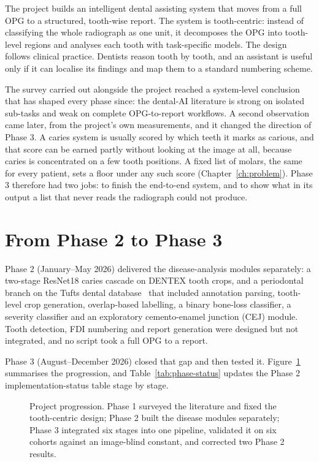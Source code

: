 The project builds an intelligent dental assisting system that moves from a full OPG to a
structured, tooth-wise report. The system is tooth-centric: instead of classifying the whole
radiograph as one unit, it decomposes the OPG into tooth-level regions and analyses each tooth with
task-specific models. The design follows clinical practice. Dentists reason tooth by tooth, and an
assistant is useful only if it can localise its findings and map them to a standard numbering
scheme. %

The survey carried out alongside the project reached a system-level conclusion that has shaped
every phase since: the dental-AI literature is strong on isolated sub-tasks and weak on complete
OPG-to-report workflows. A second observation came later, from the project's own measurements, and
it changed the direction of Phase 3. A caries system is usually scored by which teeth it marks as
carious, and that score can be earned partly without looking at the image at all, because caries is
concentrated on a few tooth positions. A fixed list of molars, the same for every patient, sets a
floor under any such score (Chapter~\ref{ch:problem}). Phase 3 therefore had two jobs: to finish the
end-to-end system, and to show what in its output a list that never reads the radiograph could not
produce.

\section{From Phase 2 to Phase 3}

Phase 2 (January--May 2026) delivered the disease-analysis modules separately: a two-stage ResNet18
caries cascade on DENTEX tooth crops, and a periodontal branch on the Tufts dental
database~\cite{panetta2022tufts} that included annotation parsing, tooth-level crop generation,
overlap-based labelling, a binary bone-loss classifier, a severity classifier and an exploratory
cemento-enamel junction (CEJ) module. Tooth detection, FDI numbering and report generation were
designed but not integrated, and no script took a full OPG to a report.

Phase 3 (August--December 2026) closed that gap and then tested it. Figure~\ref{fig:timeline}
summarises the progression, and Table~\ref{tab:phase-status} updates the Phase 2 implementation-status
table stage by stage.

\begin{figure}[H]
\centering

\caption{Project progression. Phase 1 surveyed the literature and fixed the tooth-centric design;
Phase 2 built the disease modules separately; Phase 3 integrated six stages into one pipeline,
validated it on six cohorts against an image-blind constant, and corrected two Phase 2 results.}
\label{fig:timeline}
\end{figure}

